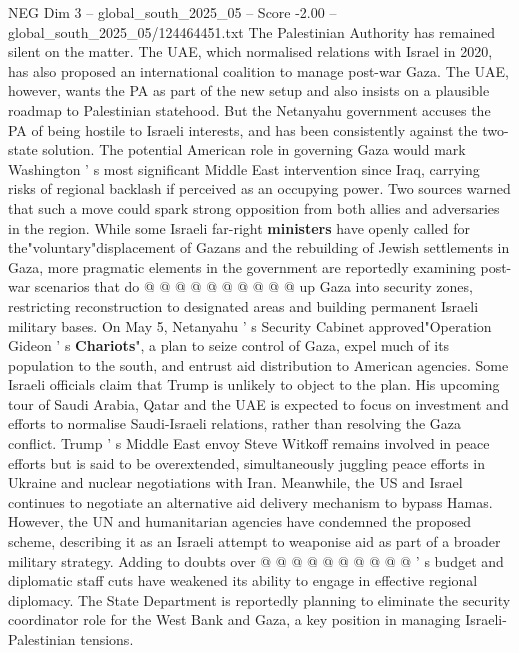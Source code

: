 \begin{textsample}{NEG Dim 3 – global\_south\_2025\_05 – Score -2.00 – global\_south\_2025\_05/124464451.txt}
The Palestinian Authority has remained silent on the matter.
The UAE, which normalised relations with Israel in 2020, has also proposed an international coalition to manage post-war Gaza.
The UAE, however, wants the PA as part of the new setup and also insists on a plausible roadmap to Palestinian statehood.
But the Netanyahu government accuses the PA of being hostile to Israeli interests, and has been consistently against the two-state solution.
The potential American role in governing Gaza would mark Washington ' s most significant Middle East intervention since Iraq, carrying risks of regional backlash if perceived as an occupying power.
Two sources warned that such a move could spark strong opposition from both allies and adversaries in the region.
While some Israeli far-right \textbf{ministers} have openly called for the"voluntary"displacement of Gazans and the rebuilding of Jewish settlements in Gaza, more pragmatic elements in the government are reportedly examining post-war scenarios that do @ @ @ @ @ @ @ @ @ @ up Gaza into security zones, restricting reconstruction to designated areas and building permanent Israeli military bases.
On May 5, Netanyahu ' s Security Cabinet approved"Operation Gideon ' s \textbf{Chariots}", a plan to seize control of Gaza, expel much of its population to the south, and entrust aid distribution to American agencies.
Some Israeli officials claim that Trump is unlikely to object to the plan.
His upcoming tour of Saudi Arabia, Qatar and the UAE is expected to focus on investment and efforts to normalise Saudi-Israeli relations, rather than resolving the Gaza conflict.
Trump ' s Middle East envoy Steve Witkoff remains involved in peace efforts but is said to be overextended, simultaneously juggling peace efforts in Ukraine and nuclear negotiations with Iran.
Meanwhile, the US and Israel continues to negotiate an alternative aid delivery mechanism to bypass Hamas.
However, the UN and humanitarian agencies have condemned the proposed scheme, describing it as an Israeli attempt to weaponise aid as part of a broader military strategy.
Adding to doubts over @ @ @ @ @ @ @ @ @ @ ' s budget and diplomatic staff cuts have weakened its ability to engage in effective regional diplomacy.
The State Department is reportedly planning to eliminate the security coordinator role for the West Bank and Gaza, a key position in managing Israeli-Palestinian tensions.

\end{textsample}
